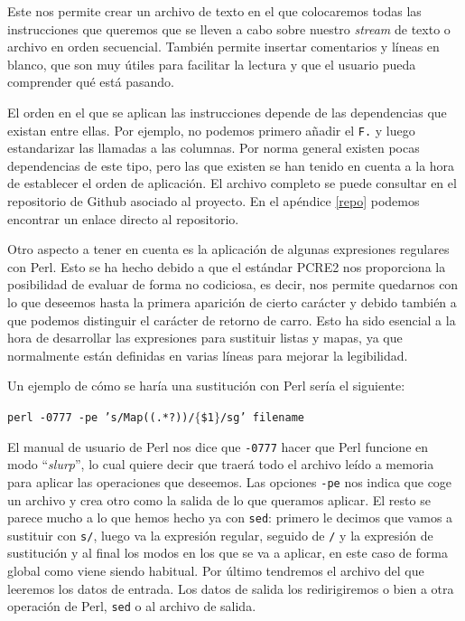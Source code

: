 \documentclass[12pt,twoside,titlepage]{report}
\newcommand{\quotes}[1]{``#1''}
\begin{document}
Este nos permite crear un archivo de texto en el que colocaremos todas las instrucciones que queremos que se lleven a cabo sobre nuestro \textit{stream} de texto o archivo en orden secuencial. También permite insertar comentarios y líneas en blanco, que son muy útiles para facilitar la lectura y que el usuario pueda comprender qué está pasando.

El orden en el que se aplican las instrucciones depende de las dependencias que existan entre ellas. Por ejemplo, no podemos primero añadir el \texttt{F.} y luego estandarizar las llamadas a las columnas. Por norma general existen pocas dependencias de este tipo, pero las que existen se han tenido en cuenta a la hora de establecer el orden de aplicación. El archivo completo se puede consultar en el repositorio de Github asociado al proyecto. En el apéndice \ref{repo} podemos encontrar un enlace directo al repositorio.

Otro aspecto a tener en cuenta es la aplicación de algunas expresiones regulares con Perl. Esto se ha hecho debido a que el estándar PCRE2 nos proporciona la posibilidad de evaluar de forma no codiciosa, es decir, nos permite quedarnos con lo que deseemos hasta la primera aparición de cierto carácter y debido también a que podemos distinguir el carácter de retorno de carro. Esto ha sido esencial a la hora de desarrollar las expresiones para sustituir listas y mapas, ya que normalmente están definidas en varias líneas para mejorar la legibilidad.

Un ejemplo de cómo se haría una sustitución con Perl sería el siguiente:

\texttt{perl -0777 -pe 's/Map((.*?))/$\lbrace$\$1$\rbrace$/sg' filename}

El manual de usuario de Perl nos dice que \texttt{-0777} hacer que Perl funcione en modo \quotes{\textit{slurp}}, lo cual quiere decir que traerá todo el archivo leído a memoria para aplicar las operaciones que deseemos. Las opciones \texttt{-pe} nos indica que coge un archivo y crea otro como la salida de lo que queramos aplicar. El resto se parece mucho a lo que hemos hecho ya con \texttt{sed}: primero le decimos que vamos a sustituir con \texttt{s/}, luego va la expresión regular, seguido de \texttt{/} y la expresión de sustitución y al final los modos en los que se va a aplicar, en este caso de forma global como viene siendo habitual. Por último tendremos el archivo del que leeremos los datos de entrada. Los datos de salida los redirigiremos o bien a otra operación de Perl, \texttt{sed} o al archivo de salida.
\end{document}
